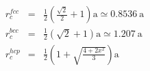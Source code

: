 \documentclass[12pt,article]{article}
\begin{document}
\begin{eqnarray*}
  r_{c}^{fcc} & = & \frac{1}{2} \left(\frac{\sqrt{2}}{2} + 1\right) \mathrm{a} \simeq 0.8536 \:\mathrm{a} \\
  r_{c}^{bcc} & = & \frac{1}{2}(\sqrt{2} + 1) \mathrm{a} \simeq 1.207 \:\mathrm{a} \\
  r_{c}^{hcp} & = & \frac{1}{2}\left(1+\sqrt{\frac{4+2x^{2}}{3}}\right) \mathrm{a}
\end{eqnarray*}
\end{document}
